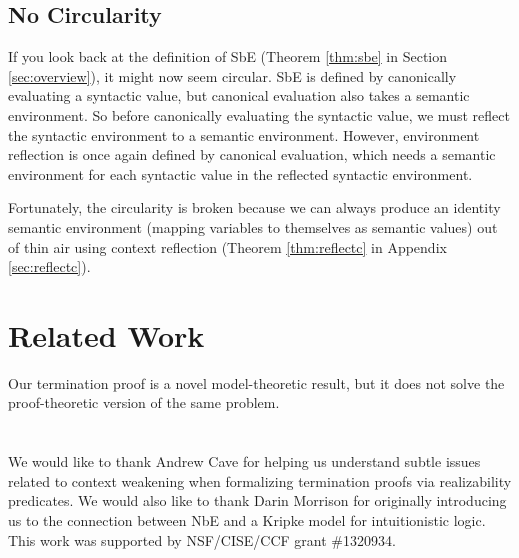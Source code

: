 \documentclass{llncs}
\newcommand{\refthm}[1]{Theorem \ref{thm:#1}}
\newcommand{\refapp}[1]{Appendix \ref{sec:#1}}
\newcommand{\refsec}[1]{Section \ref{sec:#1}}
\begin{document}
\subsection{No Circularity}

If you look back at the definition of SbE (\refthm{sbe} in
\refsec{overview}), it might now seem circular. SbE is defined by
canonically evaluating a syntactic value, but canonical evaluation
also takes a semantic environment. So before canonically evaluating
the syntactic value, we must reflect the syntactic environment to a
semantic environment. However, environment reflection is once again
defined by canonical evaluation, which needs a semantic environment
for each syntactic value in the reflected syntactic environment.

Fortunately, the circularity is broken because we can always produce
an identity semantic environment (mapping variables to themselves as
semantic values) out of thin air using context reflection
(\refthm{reflectc} in \refapp{reflectc}).

\section{Related Work}
\label{sec:related}

Our termination proof is a novel model-theoretic result, but it
does not solve the proof-theoretic version of the same problem.


\section*{\ackname}

We would like to thank Andrew Cave for helping us understand subtle
issues related to context weakening when formalizing termination
proofs via realizability predicates. We would also
like to thank Darin Morrison for originally introducing us to the connection
between NbE and a Kripke model for intuitionistic logic.
This work was supported by NSF/CISE/CCF grant \#1320934.





\end{document}
